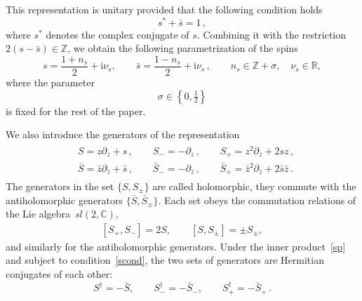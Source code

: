 \documentclass[a4paper,11pt]{article}
\renewcommand{\imath}{\mathrm{i}}
\numberwithin{equation}{section}
\begin{document}
This representation is unitary provided that the following condition holds
\begin{equation} \label{scond}
    s^\ast + \bar{s} = 1 \,,
\end{equation}
where $s^\ast$ denotes the complex conjugate of $s$. Combining it with the restriction $2(s - \bar{s}) \in \mathbb{Z}$, we obtain the following parametrization of the spins
\begin{equation}\label{sparam}
    s = \frac{1+n_s}{2} + \imath\nu_s, \qquad
    \bar{s} = \frac{1-n_s}{2} + \imath\nu_s \,,
    \qquad
    n_s \in \mathbb{Z}+\sigma, \quad \nu_s \in \mathbb{R},
\end{equation}
where the parameter
\begin{equation} \label{sigma}
    \sigma \in \left\{0, \tfrac{1}{2}\right\}
\end{equation}
is fixed for the rest of the paper.

We also introduce the generators of the representation
\begin{align} \label{gen}
    \begin{aligned}
        &S = z\partial_z + s\,, \qquad S_- = -\partial_z\,, \qquad
        S_+ = z^2\partial_z+2sz\,, \\[2pt]
        &
        \bar{S} = \bar{z}\partial_{\bar{z}} + \bar{s}\,, \qquad \bar{S}_- = -\partial_{\bar{z}}\,, \qquad
        \bar{S}_+ = \bar{z}^2\partial_{\bar{z}}+2\bar{s}\bar{z} \,.
    \end{aligned}
\end{align}
The generators in the set $\{S, S_{\pm}\}$ are called holomorphic, they commute with the antiholomorphic generators $\{\bar{S}, \bar{S}_\pm\}$. Each set obeys the commutation relations of the Lie algebra~$sl(2,\mathbb{C})$,
\begin{align} \nonumber
    [S_+, S_-] = 2S, \qquad [S,S_\pm] = \pm S_\pm,
\end{align}
and similarly for the antiholomorphic generators. Under the inner product~\eqref{sp} and subject to condition~\eqref{scond}, the two sets of generators are Hermitian conjugates of each other:
\begin{equation} \nonumber
    S^\dagger = -\bar{S}, \qquad S_-^\dagger = -\bar{S}_-, \qquad
    S_+^\dagger = -\bar{S}_+ \,.
\end{equation}
\end{document}
